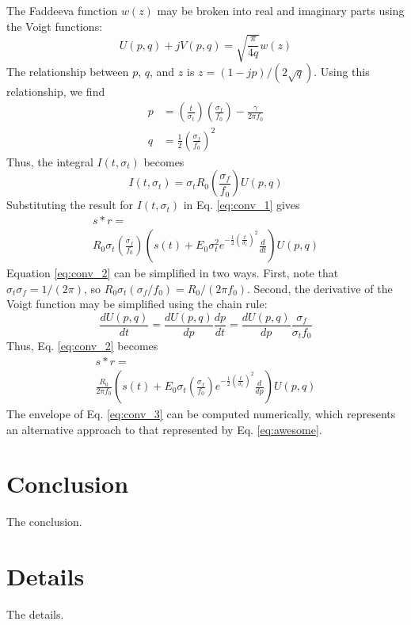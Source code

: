 \documentclass[amsmath,amssymb,aps,prd,10pt,twocolumn,showkeys]{revtex4}
\begin{document}
\begin{itemize}
The Faddeeva function $w(z)$ may be broken into real and imaginary parts using the Voigt functions:
\begin{equation}
U(p,q) + jV(p,q) = \sqrt{\frac{\pi}{4q}} w(z)
\end{equation}
The relationship between $p$, $q$, and $z$ is $z=(1-jp)/(2\sqrt{q})$.  Using this relationship, we find
\begin{align}
p &= \left(\frac{t}{\sigma_t}\right)\left(\frac{\sigma_f}{f_0}\right) - \frac{\gamma}{2\pi f_0} \\
q &= \frac{1}{2}\left(\frac{\sigma_f}{f_0}\right)^2
\end{align}
Thus, the integral $I(t,\sigma_t)$ becomes
\begin{equation}
I(t,\sigma_t) = \sigma_t R_0 \left(\frac{\sigma_f}{f_0}\right) U(p,q)
\end{equation}
Substituting the result for $I(t,\sigma_t)$ in Eq. \ref{eq:conv_1} gives
\begin{multline}
s * r = \\
 R_0\sigma_t \left(\frac{\sigma_f}{f_0}\right) \left(s(t) + E_0 \sigma_t^2 e^{-\frac{1}{2}\left(\frac{t}{\sigma_t}\right)^2} \frac{d}{dt} \right) U(p,q) \label{eq:conv_2}
\end{multline}
Equation \ref{eq:conv_2} can be simplified in two ways.  First, note that $\sigma_t \sigma_f = 1/(2\pi)$, so $R_0\sigma_t (\sigma_f/f_0) = R_0/(2\pi f_0)$.  Second, the derivative of the Voigt function may be simplified using the chain rule:
\begin{equation}
\frac{dU(p,q)}{dt} = \frac{dU(p,q)}{dp}\frac{dp}{dt} = \frac{dU(p,q)}{dp} \frac{\sigma_f}{\sigma_t f_0}
\end{equation}
Thus, Eq. \ref{eq:conv_2} becomes
\begin{multline}
s * r = \\
\frac{R_0}{2\pi f_0}\left(s(t) + E_0 \sigma_t \left(\frac{\sigma_f}{f_0}\right) e^{-\frac{1}{2}\left(\frac{t}{\sigma_t}\right)^2} \frac{d}{dp}\right)U(p,q) \label{eq:conv_3}
\end{multline}
The envelope of Eq. \ref{eq:conv_3} can be computed numerically, which represents an alternative approach to that represented by Eq. \ref{eq:awesome}.
\end{itemize}

\section{Conclusion}
\label{sec:conc}

The conclusion.

\appendix

\section{Details}
\label{app:a}

The details.


\end{document}
